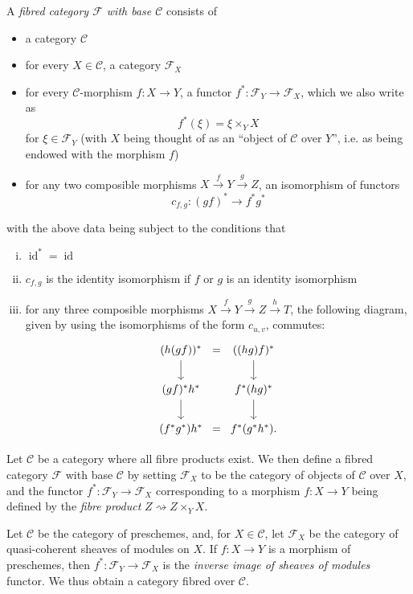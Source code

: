 \documentclass{article}
\theoremstyle{plain}
\theoremstyle{definition}
\newenvironment{definition}[1]
  {\renewcommand\theinnercustomdefinition{#1}\innercustomdefinition}
  {\endinnercustomdefinition}
\newenvironment{example}[1]
  {\renewcommand\theinnercustomexample{#1}\innercustomexample}
  {\endinnercustomexample}
\newcommand{\sh}[1]{{\mathscr{#1}}}
\newcommand{\cat}[1]{{\mathcal{#1}}}
\DeclareMathOperator{\id}{id}
\newcommand{\oldpage}[1]{\marginpar{\footnotesize$\Big\vert$ \textit{p.~#1}}}
\begin{document}
\begin{definition}{1.1}
  A \emph{fibred category $\sh{F}$ with base $\cat{C}$} consists of
  \begin{itemize}
    \item a category $\cat{C}$
    \item for every $X\in\cat{C}$, a category $\sh{F}_X$
    \item for every $\cat{C}$-morphism $f\colon X\to Y$, a functor $f^*\colon\sh{F}_Y\to\sh{F}_X$, which we also write as
      \[
        f^*(\xi) = \xi \times_Y X
      \]
      for $\xi\in\sh{F}_Y$ (with $X$ being thought of as an ``object of $\cat{C}$ over $Y$'', i.e. as being endowed with the morphism $f$)
    \item for any two composible morphisms $X\xrightarrow{f}Y\xrightarrow{g}Z$, an isomorphism of functors
      \[
        c_{f,g}\colon (gf)^* \to f^*g^*
      \]
  \end{itemize}
  with the above data being subject to the conditions that
  \begin{enumerate}[(i)]
    \item $\id^*=\id$
    \item $c_{f,g}$ is the identity isomorphism if $f$ or $g$ is an identity isomorphism
    \item for any three composible morphisms $X\xrightarrow{f}Y\xrightarrow{g}Z\xrightarrow{h}T$, the following diagram, given by using the isomorphisms of the form $c_{u,v}$, commutes:
      \[
        \begin{tikzcd}[column sep=0]
          (h(gf))^* \dar &=& ((hg)f)^* \dar
        \\(gf)^*h^* \dar && f^*(hg)^* \dar
        \\(f^*g^*)h^* &=& f^*(g^*h^*).
        \end{tikzcd}
      \]
  \end{enumerate}
\end{definition}

\begin{example}{1}
\label{example:A.1.1}
  Let $\cat{C}$ be a category where all fibre products exist.
  We then define a fibred category $\sh{F}$ with base $\cat{C}$ by setting $\sh{F}_X$ to be the category of objects of $\cat{C}$ over $X$, and the functor $f^*\colon\sh{F}_Y\to\sh{F}_X$ corresponding to a morphism $f\colon X\to Y$ being defined by the \emph{fibre product} $Z\rightsquigarrow Z\times_Y X$.
\end{example}

\begin{example}{2}
  Let $\cat{C}$ be the category of preschemes, and, for $X\in\cat{C}$, let $\sh{F}_X$ be the category of quasi-coherent sheaves of modules on $X$.
  If $f\colon X\to Y$ is a morphism of preschemes, then $f^*\colon\sh{F}_Y\to\sh{F}_X$ is the
\oldpage{190-03}
  \emph{inverse image of sheaves of modules} functor.
  We thus obtain a category fibred over $\cat{C}$.
\end{example}
\end{document}
